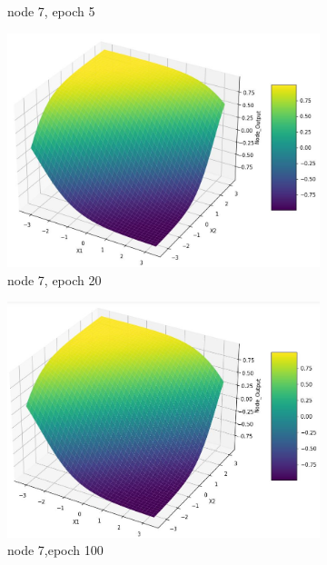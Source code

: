 \documentclass[11pt]{article}
\begin{document}
\begin{figure}[h!]
\begin{subfigure}[b]{0.3\textwidth}
	\caption{node 7, epoch 5}
	\label{fig:fig2.1.5.12}
	\end{subfigure}
	\begin{subfigure}[b]{0.3\textwidth}
	\centering
	\includegraphics[scale=0.14]{hidden1_n7_e20.jpg}
	\caption{node 7, epoch 20}
	\label{fig:fig2.1.5.13}
	\end{subfigure}
	\begin{subfigure}[b]{0.45\textwidth}
	\centering
	\includegraphics[scale=0.14]{hidden1_n7_e100.jpg}
	\caption{node 7,epoch 100}
	\label{fig:fig2.1.5.14}
	\end{subfigure}
	\begin{subfigure}[b]{0.45\textwidth}
	\centering

\end{subfigure}
\end{figure}
\end{document}
